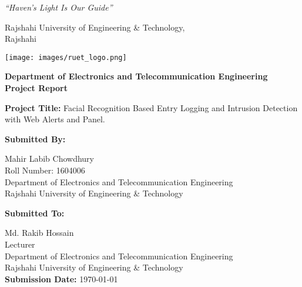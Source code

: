 
\begin{titlepage}
    \begin{center}
        \textit{``Haven's Light Is Our Guide''}\\

        \vspace{0.25cm}

        \begin{huge}
            Rajshahi University of Engineering \& Technology,\\
            Rajshahi\\
        \end{huge}

        \vspace{0.5cm}

        \texttt{[image: images/ruet\_logo.png]}
        \\
        \vspace{.5cm}

        \begin{Large}
            \textbf{Department of Electronics and Telecommunication Engineering}\\
            \huge
            \textbf{Project Report} \\
        \end{Large}

    \end{center}

    \begin{flushleft}
        \begin{Large}
            \textbf{Project Title:} Facial Recognition Based Entry Logging and Intrusion Detection with Web Alerts and Panel.\\
            \vspace{.4cm}
        \end{Large}
        \begin{large}
            \textbf{Submitted By:}\\
        \end{large}
        Mahir Labib Chowdhury\\
        Roll Number: 1604006\\
        Department of Electronics and Telecommunication Engineering\\
        Rajshahi University of Engineering \& Technology\\

        \vspace{.4cm}

        \begin{large}
            \textbf{Submitted To:}\\
        \end{large}
        Md. Rakib Hossain\\
        Lecturer\\
        Department of Electronics and Telecommunication Engineering\\
        Rajshahi University of Engineering \& Technology\\
        \vspace{.3cm}
        \textbf{Submission Date: }\today
    \end{flushleft}
\end{titlepage}